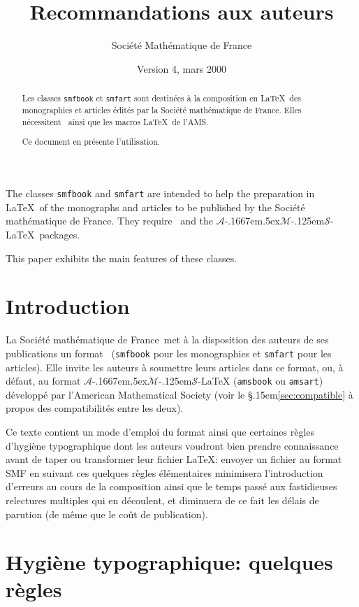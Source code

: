 \documentclass[11pt,francais]{smfart}
\title{Recommandations aux auteurs}
\date {Version 4, mars 2000}
\author{Soci\'et\'e Ma\-th\'e\-ma\-ti\-que de France}
\newcommand{\SmF}{Soci\'et\'e ma\-th\'e\-ma\-ti\-que de France}
\newcommand{\T}{\S\kern .15em\relax }
\newcommand{\AMS}{$\mathcal{A}$\kern-.1667em\lower.5ex\hbox
        {$\mathcal{M}$}\kern-.125em$\mathcal{S}$}
\begin{document}
\def\smfbyname{}

\begin{abstract}
Les classes \texttt{smfbook} et \texttt{smfart} sont destin\'ees \`a la composition en \LaTeX\ des monographies et articles \'edit\'es par la \SmF. Elles n\'ecessitent \LaTeXe\ ainsi que les macros \LaTeX\ de l'AMS.\par
Ce document en pr\'esente l'utilisation.
\end{abstract}

\begin{altabstract}
The classes \texttt{smfbook} and \texttt{smfart} are intended to help the preparation in \LaTeX\ of the monographs and articles to be published by the \SmF. They require \LaTeXe\ and the \AMS-\LaTeX\ packages.\par
This paper exhibits the main features of these classes.
\end{altabstract}
\maketitle

\tableofcontents

\section{Introduction}
La \SmF\ met \`a la disposition des auteurs de ses publications un format
\LaTeXe\ (\texttt{smfbook} pour les monographies et \texttt{smfart} pour
les articles). Elle invite les auteurs \`a soumettre leurs articles dans ce
format, ou, \`a d\'efaut, au format {\AMS-\LaTeX} (\texttt{amsbook} ou
\texttt{amsart}) d\'evelopp\'e par l'American Mathematical Society (voir le
\T\ref{sec:compatible} \`a propos des compatibilit\'es entre les deux).

\smallskip
Ce texte contient un mode d'emploi du format ainsi que certaines r\`egles
d'hygi\`ene typographique dont les auteurs voudront bien prendre
connaissance avant de taper ou transformer leur fichier \LaTeX: envoyer un
fichier au format SMF en suivant ces quelques r\`egles \'el\'ementaires
minimisera l'introduction d'erreurs au cours de la composition ainsi que le
temps pass\'e aux fastidieuses relectures multiples qui en d\'ecoulent, et
diminuera de ce fait les d\'elais de parution (de m\^eme que le co\^ut de
publication).

\section{Hygi\`ene typographique: quelques r\`egles}
\end{document}

